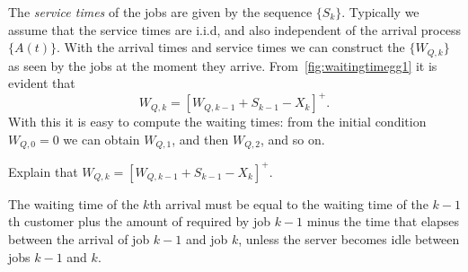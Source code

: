 The \emph{service times} of the jobs are given by the sequence $\{S_k\}$.
Typically we assume that the service times are i.i.d, and also independent of the arrival process $\{A(t)\}$.
With the arrival times and service times we can construct the  $\{W_{Q,k}\}$ as seen by the jobs at the moment they arrive. 
From~\cref{fig:waitingtimegg1} it is evident that
\begin{equation}\label{eq:56}
 W_{Q,k} = [W_{Q,k-1} + S_{k-1}-X_k]^+.
\end{equation}
With this it is easy to compute the waiting times: from the initial condition $W_{Q,0}=0$ we can obtain $W_{Q,1}$, and then $W_{Q,2}$, and so on.

\begin{extra}
Explain that $W_{Q,k} = [W_{Q,k-1} + S_{k-1}-X_k]^+$. 
\begin{solution}
The waiting time of the $k$th arrival must be equal to the waiting time of the $k-1$th customer plus the amount of  required by job $k-1$ minus the time that elapses between the arrival of job $k-1$ and job $k$, unless the server becomes idle between jobs $k-1$ and $k$.
\end{solution}
\end{extra}

